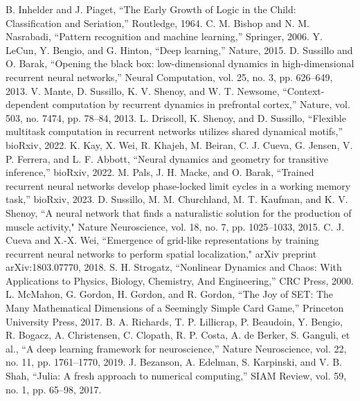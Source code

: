 \documentclass[conference]{IEEEtran}
\begin{document}
\begin{thebibliography}{00}
 B. Inhelder and J. Piaget, ``The Early Growth of Logic in the Child: Classification and Seriation,'' Routledge, 1964.
 C. M. Bishop and N. M. Nasrabadi, ``Pattern recognition and machine learning,'' Springer, 2006.
 Y. LeCun, Y. Bengio, and G. Hinton, ``Deep learning,'' Nature, 2015.
 D. Sussillo and O. Barak, ``Opening the black box: low-dimensional dynamics in high-dimensional recurrent neural networks,'' Neural Computation, vol. 25, no. 3, pp. 626--649, 2013.
 V. Mante, D. Sussillo, K. V. Shenoy, and W. T. Newsome, ``Context-dependent computation by recurrent dynamics in prefrontal cortex,'' Nature, vol. 503, no. 7474, pp. 78--84, 2013.
 L. Driscoll, K. Shenoy, and D. Sussillo, ``Flexible multitask computation in recurrent networks utilizes shared dynamical motifs,'' bioRxiv, 2022.
 K. Kay, X. Wei, R. Khajeh, M. Beiran, C. J. Cueva, G. Jensen, V. P. Ferrera, and L. F. Abbott, ``Neural dynamics and geometry for transitive inference,'' bioRxiv, 2022.
 M. Pals, J. H. Macke, and O. Barak, ``Trained recurrent neural networks develop phase-locked limit cycles in a working memory task,'' bioRxiv, 2023.
 D. Sussillo, M. M. Churchland, M. T. Kaufman, and K. V. Shenoy, ``A neural network that finds a naturalistic solution for the production of muscle activity," Nature Neuroscience, vol. 18, no. 7, pp. 1025--1033, 2015.
 C. J. Cueva and X.-X. Wei, ``Emergence of grid-like representations by training recurrent neural networks to perform spatial localization," arXiv preprint arXiv:1803.07770, 2018.
 S. H. Strogatz, ``Nonlinear Dynamics and Chaos: With Applications to Physics, Biology, Chemistry, And Engineering,'' CRC Press, 2000.
 L. McMahon, G. Gordon, H. Gordon, and R. Gordon, ``The Joy of SET: The Many Mathematical Dimensions of a Seemingly Simple Card Game,'' Princeton University Press, 2017.
 B. A. Richards, T. P. Lillicrap, P. Beaudoin, Y. Bengio, R. Bogacz, A. Christensen, C. Clopath, R. P. Costa, A. de Berker, S. Ganguli, et al., ``A deep learning framework for neuroscience,'' Nature Neuroscience, vol. 22, no. 11, pp. 1761--1770, 2019.
 J. Bezanson, A. Edelman, S. Karpinski, and V. B. Shah, ``Julia: A fresh approach to numerical computing,'' SIAM Review, vol. 59, no. 1, pp. 65--98, 2017.

\end{thebibliography}
\end{document}
